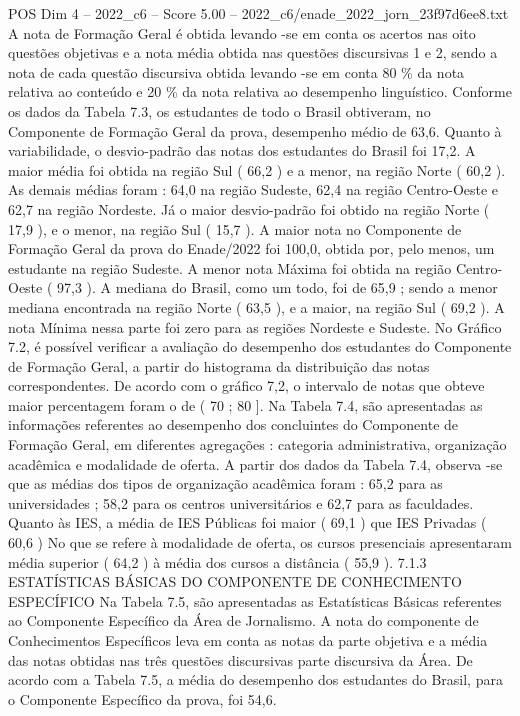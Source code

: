 \begin{textsample}{POS Dim 4 – 2022\_c6 – Score 5.00 – 2022\_c6/enade\_2022\_jorn\_23f97d6ee8.txt}
A nota de Formação Geral é obtida levando -se em conta os acertos nas oito questões objetivas e a nota média obtida nas questões discursivas 1 e 2, sendo a nota de cada questão discursiva obtida levando -se em conta 80 \% da nota relativa ao conteúdo e 20 \% da nota relativa ao desempenho linguístico.
Conforme os dados da Tabela 7.3, os estudantes de todo o Brasil obtiveram, no Componente de Formação Geral da prova, desempenho médio de 63,6.
Quanto à variabilidade, o desvio-padrão das notas dos estudantes do Brasil foi 17,2.
A maior média foi obtida na região Sul ( 66,2 ) e a menor, na região Norte ( 60,2 ).
As demais médias foram : 64,0 na região Sudeste, 62,4 na região Centro-Oeste e 62,7 na região Nordeste.
Já o maior desvio-padrão foi obtido na região Norte ( 17,9 ), e o menor, na região Sul ( 15,7 ).
A maior nota no Componente de Formação Geral da prova do Enade/2022 foi 100,0, obtida por, pelo menos, um estudante na região Sudeste.
A menor nota Máxima foi obtida na região Centro-Oeste ( 97,3 ).
A mediana do Brasil, como um todo, foi de 65,9 ; sendo a menor mediana encontrada na região Norte ( 63,5 ), e a maior, na região Sul ( 69,2 ).
A nota Mínima nessa parte foi zero para as regiões Nordeste e Sudeste.
No Gráfico 7.2, é possível verificar a avaliação do desempenho dos estudantes do Componente de Formação Geral, a partir do histograma da distribuição das notas correspondentes.
De acordo com o gráfico 7,2, o intervalo de notas que obteve maior percentagem foram o de ( 70 ; 80 ].
Na Tabela 7.4, são apresentadas as informações referentes ao desempenho dos concluintes do Componente de Formação Geral, em diferentes agregações : categoria administrativa, organização acadêmica e modalidade de oferta.
A partir dos dados da Tabela 7.4, observa -se que as médias dos tipos de organização acadêmica foram : 65,2 para as universidades ; 58,2 para os centros universitários e 62,7 para as faculdades.
Quanto às IES, a média de IES Públicas foi maior ( 69,1 ) que IES Privadas ( 60,6 ) No que se refere à modalidade de oferta, os cursos presenciais apresentaram média superior ( 64,2 ) à média dos cursos a distância ( 55,9 ). 7.1.3 ESTATÍSTICAS BÁSICAS DO COMPONENTE DE CONHECIMENTO ESPECÍFICO Na Tabela 7.5, são apresentadas as Estatísticas Básicas referentes ao Componente Específico da Área de Jornalismo.
A nota do componente de Conhecimentos Específicos leva em conta as notas da parte objetiva e a média das notas obtidas nas três questões discursivas parte discursiva da Área.
De acordo com a Tabela 7.5, a média do desempenho dos estudantes do Brasil, para o Componente Específico da prova, foi 54,6.

\end{textsample}
